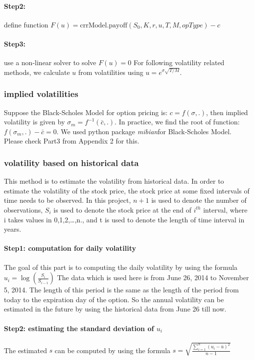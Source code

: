 \paragraph{Step2:} define function $F(u)=\text{crrModel.payoff}(S_0,K,r,u,T,M,opType)-c$
\paragraph{Step3:} use a non-linear solver to solve $F(u)=0$
For following volatility related methods, we calculate $u$ from volatilities using $u=e^{\sigma\sqrt{T/M}}$.\cite{Bible}
\subsubsection{implied volatilities}
Suppose the Black-Scholes Model for option pricing is:
$c=f(\sigma,.)$, then implied volatility is given by $\sigma_m=f^{-1}(\bar{c},.)$. In practice, we find the root of function: $f(\sigma_m,.)-\bar{c}=0$. We used python package \textit{mibian}for  Black-Scholes Model. Please check Part3 from Appendix 2 for this.
\subsubsection{volatility based on historical data}
This method is to estimate the volatility from historical data. In order to estimate the volatility of the stock price, the stock price at some fixed intervals of time needs to be observed. In this project, $n+1$ is used to denote the number of observations, $S_i$ is used to denote the stock price at the end of $i^{th}$ interval, where i takes values in 0,1,2,…,n., and t is used to denote the length of time interval in years.
\paragraph{Step1: computation for daily volatility}
The goal of this part is to computing the daily volatility by using the formula $u_i=\log(\frac{S_i}{S_{i-1}})$
The data which is used here is from June 26, 2014 to November 5, 2014. The length of this period is the same as the length of the period from today to the expiration day of the option. So the annual volatility can be estimated in the future by using the historical data from June 26 till now.
\paragraph{Step2: estimating the standard deviation of $u_i$}
The estimated $s$ can be computed by using the formula $s=\sqrt{\frac{\sum_{i=1}^{n}(u_i-\bar{u})^2}{n-1}}$

